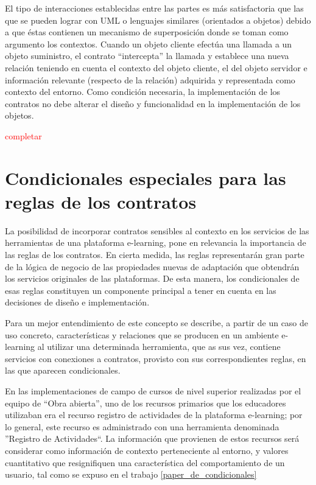 \begin{itemize}
El tipo de interacciones establecidas entre las partes es más satisfactoria
que las que se pueden lograr con UML o lenguajes similares (orientados a objetos)
debido a que éstas contienen un mecanismo de superposición donde se
toman como argumento los contextos. Cuando un objeto cliente efectúa una
llamada a un objeto suministro, el contrato “intercepta” la llamada y establece
una nueva relación teniendo en cuenta el contexto del objeto cliente, el
del objeto servidor e información relevante (respecto de la relación) adquirida
y representada como contexto del entorno. Como condición necesaria, la
implementación de los contratos no debe alterar el diseño y funcionalidad en
la implementación de los objetos.


\textcolor{red}{completar}



\section{Condicionales especiales para las reglas de los contratos}


La posibilidad de incorporar contratos sensibles al contexto en los servicios de las herramientas de una plataforma e-learning, pone en relevancia la importancia de las reglas de los contratos. En cierta medida, las reglas representarán gran parte de la lógica de negocio de las propiedades nuevas de adaptación que obtendrán los servicios originales de las plataformas. De esta manera, los condicionales de esas reglas constituyen un componente principal a tener en cuenta en las decisiones de diseño e implementación.

Para un mejor entendimiento de este concepto se describe, a partir de un caso de uso concreto, características y relaciones que se producen en un ambiente e-learning al utilizar una determinada herramienta, que as sus vez, contiene servicios con conexiones a contratos, provisto con sus correspondientes reglas, en las que aparecen condicionales.  


En las implementaciones de campo de cursos de nivel superior realizadas por
el equipo de “Obra abierta”, uno de los recursos primarios que los educadores
utilizaban era el recurso registro de actividades de la plataforma e-learning; por lo general, este recurso es administrado con una herramienta denominada ''Registro de Actividades``.  La información que provienen de estos recursos será considerar como información de contexto perteneciente al entorno, y valores cuantitativo que resignifiquen una característica del comportamiento de un usuario, tal como se expuso en el trabajo \ref{paper_de_condicionales} 



\end{itemize}
